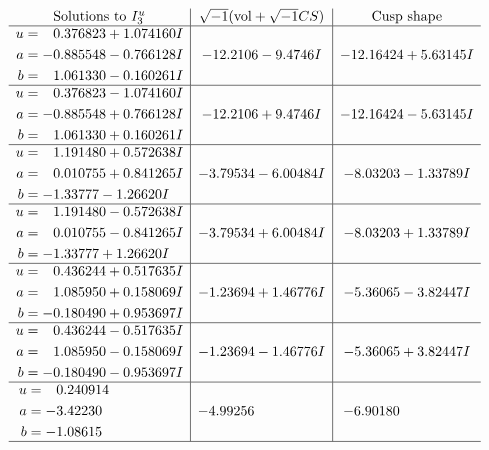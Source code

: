\documentclass[1p]{elsarticle_modified}
\theoremstyle{definition}
\newcommand{\I}{\sqrt{-1}}
\begin{document}
$$\begin{array}{c|c|c}  
\text{Solutions to }I^u_{3}& \I (\text{vol} + \sqrt{-1}CS) & \text{Cusp shape}\\
 \hline 
\begin{aligned}
u &= \phantom{-}0.376823 + 1.074160 I \\
a &= -0.885548 - 0.766128 I \\
b &= \phantom{-}1.061330 - 0.160261 I\end{aligned}
 & -12.2106 - 9.4746 I & -12.16424 + 5.63145 I \\ \hline\begin{aligned}
u &= \phantom{-}0.376823 - 1.074160 I \\
a &= -0.885548 + 0.766128 I \\
b &= \phantom{-}1.061330 + 0.160261 I\end{aligned}
 & -12.2106 + 9.4746 I & -12.16424 - 5.63145 I \\ \hline\begin{aligned}
u &= \phantom{-}1.191480 + 0.572638 I \\
a &= \phantom{-}0.010755 + 0.841265 I \\
b &= -1.33777 - 1.26620 I\end{aligned}
 & -3.79534 - 6.00484 I & -8.03203 - 1.33789 I \\ \hline\begin{aligned}
u &= \phantom{-}1.191480 - 0.572638 I \\
a &= \phantom{-}0.010755 - 0.841265 I \\
b &= -1.33777 + 1.26620 I\end{aligned}
 & -3.79534 + 6.00484 I & -8.03203 + 1.33789 I \\ \hline\begin{aligned}
u &= \phantom{-}0.436244 + 0.517635 I \\
a &= \phantom{-}1.085950 + 0.158069 I \\
b &= -0.180490 + 0.953697 I\end{aligned}
 & -1.23694 + 1.46776 I & -5.36065 - 3.82447 I \\ \hline\begin{aligned}
u &= \phantom{-}0.436244 - 0.517635 I \\
a &= \phantom{-}1.085950 - 0.158069 I \\
b &= -0.180490 - 0.953697 I\end{aligned}
 & -1.23694 - 1.46776 I & -5.36065 + 3.82447 I \\ \hline\begin{aligned}
u &= \phantom{-}0.240914\phantom{ +0.000000I} \\
a &= -3.42230\phantom{ +0.000000I} \\
b &= -1.08615\phantom{ +0.000000I}\end{aligned}
 & -4.99256\phantom{ +0.000000I} & -6.90180\phantom{ +0.000000I}\\
 \hline 
 \end{array}$$\newpage\newpage\renewcommand{\arraystretch}{1}
\end{document}

